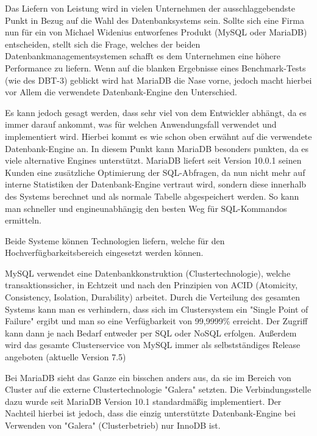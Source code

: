 
Das Liefern von Leistung wird in vielen Unternehmen der ausschlaggebendste Punkt in Bezug auf die Wahl des Datenbanksystems sein. Sollte sich eine Firma nun für ein von Michael Widenius entworfenes Produkt (MySQL oder MariaDB) entscheiden, stellt sich die Frage, welches der beiden Datenbankmanagementsystemen schafft es dem Unternehmen eine höhere Performance zu liefern. Wenn auf die blanken Ergebnisse eines Benchmark-Tests (wie des DBT-3) geblickt wird hat MariaDB die Nase vorne, jedoch macht hierbei vor Allem die verwendete Datenbank-Engine den Unterschied. \cite{MariaVsMy}

Es kann jedoch gesagt werden, dass sehr viel von dem Entwickler abhängt, da es immer darauf ankommt, was für welchen Anwendungsfall verwendet und implementiert wird. Hierbei kommt es wie schon oben erwähnt auf die verwendete Datenbank-Engine an. In diesem Punkt kann MariaDB besonders punkten, da es viele alternative Engines unterstützt. MariaDB liefert seit Version 10.0.1 seinen Kunden eine zusätzliche Optimierung der SQL-Abfragen, da nun nicht mehr auf interne Statistiken der Datenbank-Engine vertraut wird, sondern diese innerhalb des Systems berechnet und als normale Tabelle abgespeichert werden. So kann man schneller und engineunabhängig den besten Weg für SQL-Kommandos ermitteln. \cite{MariaVsMy}


Beide Systeme können Technologien liefern, welche für den Hochverfügbarkeitsbereich eingesetzt werden können.

MySQL verwendet eine Datenbankkonstruktion (Clustertechnologie), welche transaktionssicher, in Echtzeit und nach den Prinzipien von ACID (Atomicity, Consistency, Isolation, Durability) arbeitet. Durch die Verteilung des gesamten Systems kann man es verhindern, dass sich im Clustersystem ein "Single Point of Failure" ergibt und man so eine Verfügbarkeit von 99,9999\% erreicht. Der Zugriff kann dann je nach Bedarf entweder per SQL oder NoSQL erfolgen. Außerdem wird das gesamte Clusterservice von MySQL immer als selbstständiges Release angeboten (aktuelle Version 7.5) \cite{MariaVsMy}

Bei MariaDB sieht das Ganze ein bisschen anders aus, da sie im Bereich von Cluster auf die externe Clustertechnologie "Galera" setzten. Die Verbindungsstelle dazu wurde seit MariaDB Version 10.1 standardmäßig implementiert. Der Nachteil hierbei ist jedoch, dass die einzig unterstützte Datenbank-Engine bei Verwenden von "Galera" (Clusterbetrieb) nur InnoDB ist. \cite{MariaVsMy}

